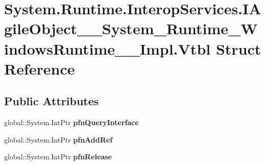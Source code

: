 \hypertarget{struct_system_1_1_runtime_1_1_interop_services_1_1_i_agile_object_____system___runtime___windows_runtime_____impl_1_1_vtbl}{}\section{System.\+Runtime.\+Interop\+Services.\+I\+Agile\+Object\+\_\+\+\_\+\+System\+\_\+\+Runtime\+\_\+\+Windows\+Runtime\+\_\+\+\_\+\+Impl.\+Vtbl Struct Reference}
\label{struct_system_1_1_runtime_1_1_interop_services_1_1_i_agile_object_____system___runtime___windows_runtime_____impl_1_1_vtbl}
\subsection*{Public Attributes}
\begin{DoxyCompactItemize}
\item 
\mbox{\label{struct_system_1_1_runtime_1_1_interop_services_1_1_i_agile_object_____system___runtime___windows_runtime_____impl_1_1_vtbl_ab09a9b47d955db1c2bc977b2118f53e7}} 
global\+::\+System.\+Int\+Ptr {\bfseries pfn\+Query\+Interface}
\item 
\mbox{\label{struct_system_1_1_runtime_1_1_interop_services_1_1_i_agile_object_____system___runtime___windows_runtime_____impl_1_1_vtbl_a3b2c23abf1949c23f08f775a3ff3ca88}} 
global\+::\+System.\+Int\+Ptr {\bfseries pfn\+Add\+Ref}
\item 
\mbox{\label{struct_system_1_1_runtime_1_1_interop_services_1_1_i_agile_object_____system___runtime___windows_runtime_____impl_1_1_vtbl_a32beffabc1a4fb8d9cbf7fa9c851a681}} 
global\+::\+System.\+Int\+Ptr {\bfseries pfn\+Release}
\end{DoxyCompactItemize}
